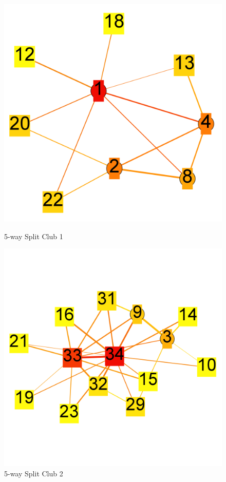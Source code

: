 \documentclass[paper=a4, fontsize=11pt]{scrartcl} %
\numberwithin{equation}{section} %
\numberwithin{figure}{section} %
\numberwithin{table}{section} %
\begin{document}
\begin{figure}[H]
\centering
\begin{minipage}{.5\textwidth}
  \centering
\includegraphics[width=1\textwidth]{5clubs/club1}
\caption{5-way Split Club 1}
\label{fig:5clubs1}
\end{minipage}%
\begin{minipage}{.5\textwidth}
  \centering
\includegraphics[width=1\textwidth]{5clubs/club2}
\caption{5-way Split Club 2}
\label{fig:5clubs2}
\end{minipage}
\end{figure}
\end{document}
